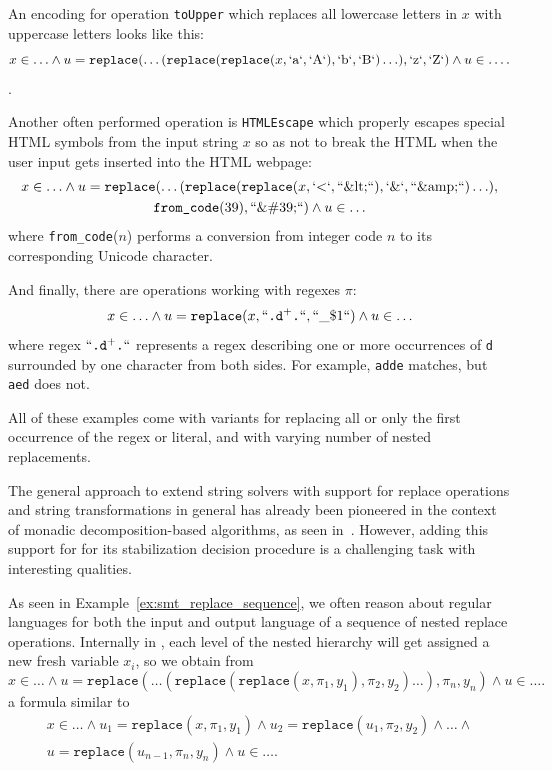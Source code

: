 \begin{example}\label{ex:smt_replace_sequence}
  An encoding for operation \texttt{toUpper} which replaces all lowercase letters in $x$ with uppercase letters looks like this:
  $$ x \in \ldots \land u = \texttt{replace}(\ldots (\texttt{replace}(\texttt{replace}(x, `\text{a}`, `\text{A}`), `\text{b}`, `\text{B}`)\ldots), `\text{z}`, `\text{Z}`)\land u \in \ldots \text{.}$$.

  Another often performed operation is \texttt{HTMLEscape} which properly escapes special HTML symbols from the input string $x$ so as not to break the HTML when the user input gets inserted into the HTML webpage:
  \begin{multline*}
  x \in \ldots \land u = \texttt{replace}(\ldots (\texttt{replace}(\texttt{replace}(x, `\text{<}`, ``\text{\&lt;}``), `\text{\&}`, ``\text{\&amp;}``)\ldots), \\
  \texttt{from\_code}(39), ``\text{\&\#39;}``)\land u \in \ldots
  \end{multline*}
  where \texttt{from\_code}($n$) performs a conversion from integer code $n$ to its corresponding Unicode character.

  And finally, there are operations working with regexes $\pi$:
  $$
    x \in \ldots \land u = \texttt{replace}(x, ``\texttt{.d}^+\texttt{.}``, ``\text{\_\$1}``)\land u \in \ldots
  $$
where regex $``\texttt{.d}^+\texttt{.}``$ represents a regex describing one or more occurrences of \texttt{d} surrounded by one character from both sides. For example, \texttt{adde} matches, but \texttt{aed} does not.

All of these examples come with variants for replacing all or only the first occurrence of the regex or literal, and with varying number of nested replacements.

The general approach to extend string solvers with support for replace operations and string transformations in general has already been pioneered in the context of monadic decomposition-based algorithms, as seen in~\cite{AnthonyReplaceAll2018, Flatten, ChainFree, StringAFA}.
However, adding this support for \noodler for its stabilization decision procedure is a challenging task with interesting qualities.

\end{example}

As seen in Example~\ref{ex:smt_replace_sequence}, we often reason about regular languages for both the input and output language of a sequence of nested replace operations.
Internally in \noodler, each level of the nested hierarchy will get assigned a new fresh variable $x_i$, so we obtain from
$$
x \in \ldots \land u = \texttt{replace}(\ldots (\texttt{replace}(\texttt{replace}(x, \pi_1, y_1), \pi_2, y_2)\ldots), \pi_n, y_n) \land u \in \ldots \text{.}
$$
a formula similar to
\begin{multline*}
x \in \ldots \land u_1 = \texttt{replace}(x, \pi_1, y_1) \land u_2 = \texttt{replace}(u_1, \pi_2, y_2) \land \ldots \land \\u = \texttt{replace}(u_{n-1}, \pi_n, y_n) \land u \in \ldots \text{.}
\end{multline*}

